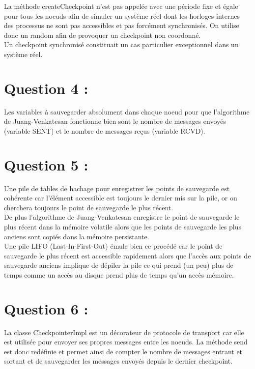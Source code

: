 \documentclass[11pt,a4paper]{report}
\begin{document}
La méthode createCheckpoint n'est pas appelée avec une période fixe et égale pour tous les noeuds afin de simuler un système réel dont les horloges internes des processus ne sont pas accessibles et pas forcément synchronisés. On utilise donc un random afin de provoquer un checkpoint non coordonné.\\

Un checkpoint synchronisé constituait un cas particulier exceptionnel dans un système réel.\\


\section{Question 4 :}

Les variables à sauvegarder absolument dans chaque noeud pour que l'algorithme de Juang-Venkatesan fonctionne bien sont le nombre de messages envoyés (variable SENT) et le nombre de messages reçus (variable RCVD).\\

\section{Question 5 :}

Une pile de tables de hachage pour enregistrer les points de sauvegarde est cohérente car l'élément accessible est toujours le dernier mis sur la pile, or on cherchera toujours le point de sauvegarde le plus récent.\\

De plus l'algorithme de Juang-Venkatesan enregistre le point de sauvegarde le plus récent dans la mémoire volatile alors que les points de sauvegarde les plus anciens sont copiés dans la mémoire persistante.\\

Une pile LIFO (Last-In-First-Out) émule bien ce procédé car le point de sauvegarde le plus récent est accessible rapidement alors que l'accès aux points de sauvegarde anciens implique de dépiler la pile ce qui prend (un peu) plus de temps comme un accès au disque prend plus de temps qu'un accès mémoire.\\


\section{Question 6 :}

La classe CheckpointerImpl est un décorateur de protocole de transport car elle est utilisée pour envoyer ses propres messages entre les noeuds. La méthode send est donc redéfinie et permet ainsi de compter le nombre de messages entrant et sortant et de sauvegarder les messages envoyés depuis le dernier checkpoint.\\
\end{document}
